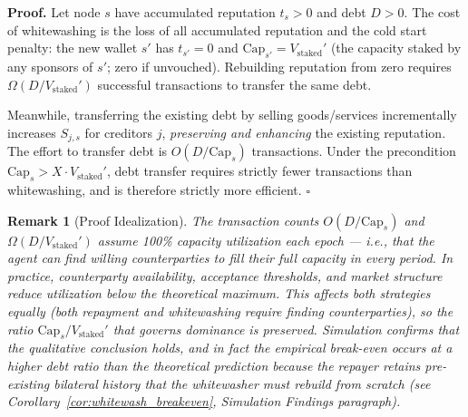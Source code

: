\documentclass[11pt]{article}
\newtheorem{remark}[theorem]{Remark}
\newcommand{\qed}{\hfill}
\newenvironment{proof}{\noindent\textbf{Proof.}}{\qed$\square$\par\medskip}
\begin{document}
\begin{proof}
Let node $s$ have accumulated reputation $t_s > 0$ and debt $D > 0$. The cost of whitewashing is the loss of all accumulated reputation and the cold start penalty: the new wallet $s'$ has $t_{s'} = 0$ and $\text{Cap}_{s'} = V_{\text{staked}}'$ (the capacity staked by any sponsors of $s'$; zero if unvouched). Rebuilding reputation from zero requires $\Omega(D / V_{\text{staked}}')$ successful transactions to transfer the same debt.

Meanwhile, transferring the existing debt by selling goods/services incrementally increases $S_{j,s}$ for creditors $j$, \emph{preserving and enhancing} the existing reputation. The effort to transfer debt is $O(D / \text{Cap}_s)$ transactions. Under the precondition $\text{Cap}_s > X \cdot V_{\text{staked}}'$, debt transfer requires strictly fewer transactions than whitewashing, and is therefore strictly more efficient. \qed
\end{proof}

\begin{remark}[Proof Idealization]\label{rem:proof_idealization}
The transaction counts $O(D / \text{Cap}_s)$ and $\Omega(D / V_{\text{staked}}')$ assume 100\% capacity utilization each epoch --- i.e., that the agent can find willing counterparties to fill their full capacity in every period. In practice, counterparty availability, acceptance thresholds, and market structure reduce utilization below the theoretical maximum. This affects \emph{both} strategies equally (both repayment and whitewashing require finding counterparties), so the ratio $\text{Cap}_s / V_{\text{staked}}'$ that governs dominance is preserved. Simulation confirms that the qualitative conclusion holds, and in fact the empirical break-even occurs at a higher debt ratio than the theoretical prediction because the repayer retains pre-existing bilateral history that the whitewasher must rebuild from scratch (see Corollary~\ref{cor:whitewash_breakeven}, Simulation Findings paragraph).
\end{remark}
\end{document}
